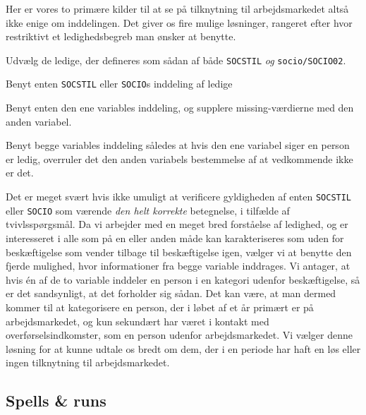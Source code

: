 % 
Her er vores to primære kilder til at se på tilknytning til arbejdsmarkedet altså ikke enige om inddelingen. Det giver os fire mulige løsninger, rangeret efter hvor restriktivt et ledighedsbegreb man ønsker at benytte.
%
\begin{description} [topsep=6pt,itemsep=-1ex]
  \item[Restriktiv] Udvælg de ledige, der defineres som sådan af både \texttt{SOCSTIL} \emph{og} \texttt{socio/SOCIO02}.
  \item[Semirestriktiv] Benyt enten \texttt{SOCSTIL} eller \texttt{SOCIO}s inddeling af ledige
  \item[Semibred] Benyt enten den ene variables inddeling, og supplere missing-værdierne med den anden variabel.
 \item[Bred] Benyt begge variables inddeling således at hvis den ene variabel siger en person er ledig, overruler det den anden variabels bestemmelse af at vedkommende ikke er det.
\end{description}
%
Det er meget svært hvis ikke umuligt at verificere gyldigheden af enten \texttt{SOCSTIL} eller \texttt{SOCIO} som værende \emph{den helt korrekte} betegnelse, i tilfælde af tvivlsspørgsmål. Da vi arbejder med en meget bred forståelse af ledighed, og er interesseret i alle som på en eller anden måde kan karakteriseres som uden for beskæftigelse som vender tilbage til beskæftigelse igen, vælger vi at benytte den fjerde mulighed, hvor informationer fra begge variable inddrages. Vi antager, at hvis én af de to variable inddeler en person i en kategori udenfor beskæftigelse, så er det sandsynligt, at det forholder sig sådan. Det kan være, at man dermed kommer til at kategorisere en person, der i løbet af et år primært er på arbejdsmarkedet, og kun sekundært har været i kontakt med overførselsindkomster, som en person udenfor arbejdsmarkedet. Vi vælger denne løsning for at kunne udtale os bredt om dem, der i en periode har haft en løs eller ingen tilknytning til arbejdsmarkedet. 



\subsection{Spells \& runs \label{spells_runs}} 

